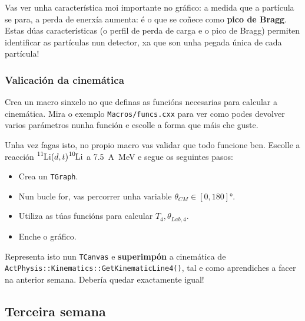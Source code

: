 \documentclass[11pt, a4paper]{article}
\newcommand{\iso}[2]{\ce{^{#1}#2}}
\begin{document}
Vas ver unha característica moi importante no gráfico: a medida que a partícula se para, a perda de enerxía aumenta: é o que se coñece como \textbf{pico de Bragg}. Estas dúas características (o perfil de perda de carga e o pico de Bragg) permiten identificar as partículas nun detector, xa que son unha pegada única de cada partícula!

\subsubsection*{Valicación da cinemática}
Crea un macro sinxelo no que definas as funcións necesarias para calcular a cinemática. Mira o exemplo \lstinline|Macros/funcs.cxx| para ver como podes devolver varios parámetros nunha función e escolle a forma que máis che guste.

Unha vez fagas isto, no propio macro vas validar que todo funcione ben. Escolle a reacción $\iso{11}{Li}(d, t)\iso{10}{Li}$ a \qty{7.5}{A\MeV} e segue os seguintes pasos:
\begin{itemize}
    \item Crea un \lstinline|TGraph|.
    \item Nun bucle for, vas percorrer unha variable $\theta_{CM} \in [0, 180]\unit{\degree}$.
    \item Utiliza as túas funcións para calcular $T_{4}, \theta_{Lab, 4}$.
    \item Enche o gráfico.
\end{itemize}
Representa isto nun \lstinline|TCanvas| e \textbf{superimpón} a cinemática de \lstinline|ActPhysis::Kinematics::GetKinematicLine4()|, tal e como aprendiches a facer na anterior semana. Debería quedar exactamente igual!

\subsection{Terceira semana}
\end{document}
